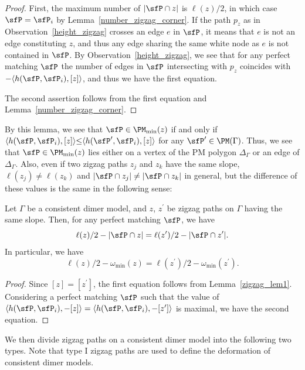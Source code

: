 \begin{proof}
First, the maximum number of $|\sfP\cap z|$ is $\ell(z)/2$, in which case $\sfP=\sfP_i$ by Lemma~\ref{number_zigzag_corner}.
If the path $p_z$ as in Observation~\ref{height_zigzag} crosses an edge $e$ in $\sfP$, it means that $e$ is not an edge constituting $z$, and thus any edge sharing the same white node as $e$ is not contained in $\sfP$.
By Observation~\ref{height_zigzag}, we see that for any perfect matching $\sfP$ the number of edges in $\sfP$ intersecting with $p_z$ coincides with $-\langle h(\sfP,\sfP_i),[z]\rangle$, and thus we have the first equation.

The second assertion follows from the first equation and Lemma~\ref{number_zigzag_corner}.
\end{proof}

By this lemma, we see that $\sfP\in\PM_{\min}(z)$ if and only if $\langle h(\sfP,\sfP_i),[z]\rangle{\le} \langle h(\sfP^\prime,\sfP_i),[z]\rangle$ for any $\sfP^\prime\in\PM(\Gamma)$.
Thus, we see that $\sfP\in\PM_{\min}(z)$ lies either on a vertex of the PM polygon $\Delta_\Gamma$ or an edge of $\Delta_\Gamma$.
Also, even if two zigzag paths $z_j$ and $z_k$ have the same slope, $\ell(z_j)\neq\ell(z_k)$ and $|\sfP\cap z_j|\neq|\sfP\cap z_k|$ in general,
but the difference of these values is the same in the following sense:

\begin{Lemma}\label{zigzag_lem2}
Let $\Gamma$ be a consistent dimer model, and $z$, $z^\prime$ be zigzag paths on $\Gamma$ having the same slope.
Then, for any perfect matching $\sfP$, we have
\begin{displaymath}
\ell(z)/2-|\sfP\cap z|=\ell(z^\prime)/2-|\sfP\cap z^\prime|.
\end{displaymath}
In particular, we have
\begin{displaymath}
\ell(z)/2-\omega_{\min}(z)=\ell(z^\prime)/2-\omega_{\min}(z^\prime).
\end{displaymath}
\end{Lemma}

\begin{proof}Since $[z]=[z^\prime]$, the first equation follows from Lemma~\ref{zigzag_lem1}.
Considering a perfect matching $\sfP$ such that the value of $\langle h(\sfP,\sfP_i),-[z]\rangle=\langle h(\sfP,\sfP_i),-[z^\prime]\rangle$ is maximal, we have the second equation.
\end{proof}

We then divide zigzag paths on a consistent dimer model into the following two types. Note that type I zigzag paths are used to define the deformation of consistent dimer models.

